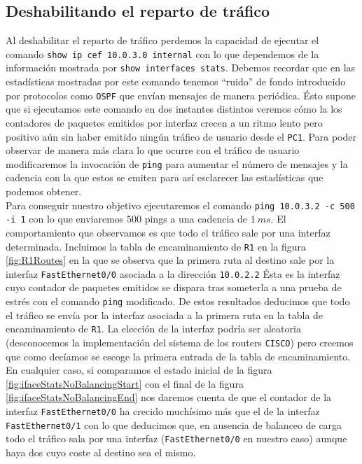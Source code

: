 \documentclass[11pt]{article}
\begin{document}
        \subsection{Deshabilitando el reparto de tráfico}
            Al deshabilitar el reparto de tráfico perdemos la capacidad de ejecutar el comando \texttt{show ip cef 10.0.3.0 internal} con lo que dependemos de la información mostrada por \texttt{show interfaces stats}. Debemos recordar que en las estadísticas mostradas por este comando tenemos ``ruido'' de fondo introducido por protocolos como \texttt{OSPF} que envían mensajes de manera periódica. Ésto supone que si ejecutamos este comando en dos instantes distintos veremos cómo la los contadores de paquetes emitidos por interfaz crecen a un ritmo lento pero positivo aún sin haber emitido ningún tráfico de usuario desde el \texttt{PC1}. Para poder observar de manera más clara lo que ocurre con el tráfico de usuario modificaremos la invocación de \texttt{ping} para aumentar el número de mensajes y la cadencia con la que estos se emiten para así esclarecer las estadísticas que podemos obtener.\\

            Para conseguir nuestro objetivo ejecutaremos el comando \texttt{ping 10.0.3.2 -c 500 -i 1} con lo que enviaremos $500$ pings a una cadencia de $1\ ms$. El comportamiento que observamos es que todo el tráfico sale por una interfaz determinada. Incluimos la tabla de encaminamiento de \texttt{R1} en la figura \ref{fig:R1Routes} en la que se observa que la primera ruta al destino sale por la interfaz \texttt{FastEthernet0/0} asociada a la dirección \texttt{10.0.2.2} Ésta es la interfaz cuyo contador de paquetes emitidos se dispara tras someterla a una prueba de estrés con el comando \texttt{ping} modificado. De estos resultados deducimos que todo el tráfico se envía por la interfaz asociada a la primera ruta en la tabla de encaminamiento de \texttt{R1}. La elección de la interfaz podría ser aleatoria (desconocemos la implementación del sistema de los routers \texttt{CISCO}) pero creemos que como decíamos se escoge la primera entrada de la tabla de encaminamiento. En cualquier caso, si comparamos el estado inicial de la figura \ref{fig:ifaceStatsNoBalancingStart} con el final de la figura \ref{fig:ifaceStatsNoBalancingEnd} nos daremos cuenta de que el contador de la interfaz \texttt{FastEthernet0/0} ha crecido muchísimo más que el de la interfaz \texttt{FastEthernet0/1} con lo que deducimos que, en ausencia de balanceo de carga todo el tráfico sala por una interfaz (\texttt{FastEthernet0/0} en nuestro caso) aunque haya dos cuyo coste al destino sea el mismo.
\end{document}
